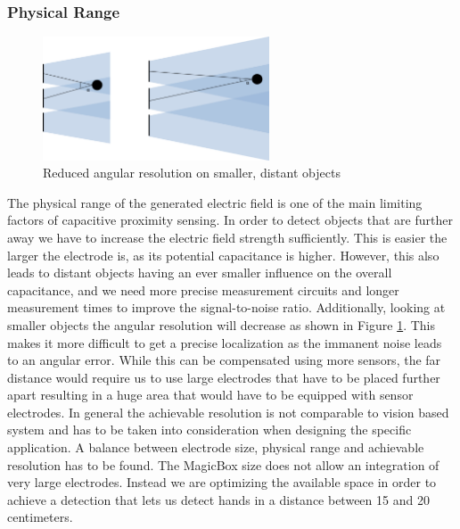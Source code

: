 \subsubsection{Physical Range}
\begin{figure}[h]
\centering
\includegraphics[width=0.6\textwidth]{images/limit_distance.png}
\caption{Reduced angular resolution on smaller, distant objects}
\label{fig:disc_ang_resolution}
\end{figure}
The physical range of the generated electric field is one of the main limiting factors of capacitive proximity sensing. In order to detect objects that are further away we have to increase the electric field strength sufficiently. This is easier the larger the electrode is, as its potential capacitance is higher. However, this also leads to distant objects having an ever smaller influence on the overall capacitance, and we need more precise measurement circuits and longer measurement times to improve the signal-to-noise ratio. Additionally, looking at smaller objects the angular resolution will decrease as shown in Figure \ref{fig:disc_ang_resolution}. This makes it more difficult to get a precise localization as the immanent noise leads to an angular error. While this can be compensated using more sensors, the far distance would require us to use large electrodes that have to be placed further apart resulting in a huge area that would have to be equipped with sensor electrodes.
In general the achievable resolution is not comparable to vision based system and has to be taken into consideration when designing the specific application. A balance between electrode size, physical range and achievable resolution has to be found.
The MagicBox size does not allow an integration of very large electrodes. Instead we are optimizing the available space in order to achieve a detection that lets us detect hands in a distance between 15 and 20 centimeters.
